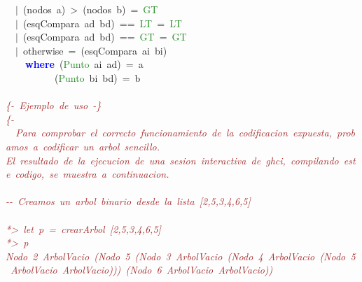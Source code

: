 \begin{allintypewriter}
\mbox{}\ \ \textcolor{BrickRed}{$|$}\ \textcolor{BrickRed}{(}nodos\ a\textcolor{BrickRed}{)}\ \textcolor{BrickRed}{\textgreater{}}\ \textcolor{BrickRed}{(}nodos\ b\textcolor{BrickRed}{)}\ \textcolor{BrickRed}{=}\ \textcolor{ForestGreen}{GT} \\
\mbox{}\ \ \textcolor{BrickRed}{$|$}\ \textcolor{BrickRed}{(}esqCompara\ ad\ bd\textcolor{BrickRed}{)}\ \textcolor{BrickRed}{==}\ \textcolor{ForestGreen}{LT}\ \textcolor{BrickRed}{=}\ \textcolor{ForestGreen}{LT} \\
\mbox{}\ \ \textcolor{BrickRed}{$|$}\ \textcolor{BrickRed}{(}esqCompara\ ad\ bd\textcolor{BrickRed}{)}\ \textcolor{BrickRed}{==}\ \textcolor{ForestGreen}{GT}\ \textcolor{BrickRed}{=}\ \textcolor{ForestGreen}{GT} \\
\mbox{}\ \ \textcolor{BrickRed}{$|$}\ otherwise\ \textcolor{BrickRed}{=}\ \textcolor{BrickRed}{(}esqCompara\ ai\ bi\textcolor{BrickRed}{)} \\
\mbox{}\ \ \ \ \textbf{\textcolor{Blue}{where}}\ \textcolor{BrickRed}{(}\textcolor{ForestGreen}{Punto}\ ai\ ad\textcolor{BrickRed}{)}\ \textcolor{BrickRed}{=}\ a \\
\mbox{}\ \ \ \ \ \ \ \ \ \ \textcolor{BrickRed}{(}\textcolor{ForestGreen}{Punto}\ bi\ bd\textcolor{BrickRed}{)}\ \textcolor{BrickRed}{=}\ b \\
\mbox{} \\
\mbox{}\textit{\textcolor{Brown}{\{-\ Ejemplo\ de\ uso\ -\}}} \\
\mbox{}\textit{\textcolor{Brown}{\{-}} \\
\mbox{}\textit{\textcolor{Brown}{\ \ Para\ comprobar\ el\ correcto\ funcionamiento\ de\ la\ codificacion\ expuesta,\ probamos\ a\ codificar\ un\ arbol\ sencillo.}} \\
\mbox{}\textit{\textcolor{Brown}{El\ resultado\ de\ la\ ejecucion\ de\ una\ sesion\ interactiva\ de\ ghci,\ compilando\ este\ codigo,\ se\ muestra\ a\ continuacion.}} \\
\mbox{} \\
\mbox{}\textit{\textcolor{Brown}{-\/-\ Creamos\ un\ arbol\ binario\ desde\ la\ lista\ [2,5,3,4,6,5]}} \\
\mbox{} \\
\mbox{}\textit{\textcolor{Brown}{*\textgreater{}\ let\ p\ =\ crearArbol\ [2,5,3,4,6,5]}} \\
\mbox{}\textit{\textcolor{Brown}{*\textgreater{}\ p}} \\
\mbox{}\textit{\textcolor{Brown}{Nodo\ 2\ ArbolVacio\ (Nodo\ 5\ (Nodo\ 3\ ArbolVacio\ (Nodo\ 4\ ArbolVacio\ (Nodo\ 5\ ArbolVacio\ ArbolVacio)))\ (Nodo\ 6\ ArbolVacio\ ArbolVacio))}} \\

\end{allintypewriter}
